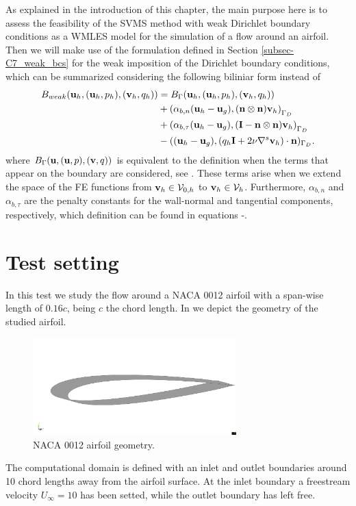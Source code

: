 As explained in the introduction of this chapter, the main purpose here is to assess the feasibility of the SVMS method with weak Dirichlet boundary conditions as a WMLES model for the simulation of a flow around an airfoil. Then we will make use of the formulation defined in Section \ref{subsec-C7_weak_bcs} for the weak imposition of the Dirichlet boundary conditions, which can be summarized considering the following biliniar form instead of 
\begin{align}
\label{eq-C8_bilinear_weak_by_components}
B_{weak}({\bf u}_h,({\bf u}_h,p_h),({\bf v}_h,q_h))&=B_\Gamma({\bf u}_h,({\bf u}_h,p_h),({\bf v}_h,q_h))\\\nonumber
&+\left(\alpha_{b,n}({\bf u}_h-{\bf u}_g),({\bf n}\otimes{\bf n}){\bf v}_h\right)_{\Gamma_D}\\\nonumber
&+\left(\alpha_{b,\tau}({\bf u}_h-{\bf u}_g),(\mathbf{I}-{\bf n}\otimes{\bf n}){\bf v}_h\right)_{\Gamma_D}\\\nonumber
&-(({\bf u}_h-{\bf u}_g),(q_h\mathbf{I}+2\nu\nabla^s{\bf v}_h)\cdot{\bf n})_{\Gamma_D}.
\end{align}
where $ B_\Gamma({\bf u},({\bf u},p),({\bf v},q)) $ is equivalent to the definition  when the terms that appear on the boundary are considered, see . These terms arise when we extend the space of the FE functions from $ {\bf v}_h\in\mathcal{V}_{0,h} $ to $ {\bf v}_h\in\mathcal{V}_h $. Furthermore, $ \alpha_{b,n} $ and $ \alpha_{b,\tau} $ are the penalty constants for the wall-normal and tangential components, respectively, which definition can be found in equations -.

\section{Test setting}
\label{sec-C8_setting}
In this test we study the flow around a NACA 0012 airfoil with a span-wise length of $ 0.16c $, being $ c $ the chord length. In  we depict the geometry of the studied airfoil.
\begin{figure}[h!]
  \centering
  \includegraphics[width=0.7\textwidth,clip=true,trim=5cm 8cm 1cm 8cm]{Figures/Chapter8/geometry_3d}
  \caption{NACA 0012 airfoil geometry.}
  \label{fig-NACA_geometry}
\end{figure}
The computational domain is defined with an inlet and outlet boundaries around 10 chord lengths away from the airfoil surface. At the inlet boundary a freestream velocity $U_\infty=10$ has been setted, while the outlet boundary has left free. 

